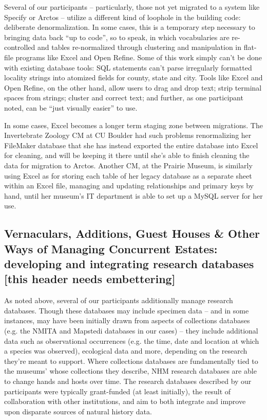 Several of our participants -- particularly, those not yet migrated to a system like Specify or Arctos -- utilize a different kind of loophole in the building code: deliberate denormalization. In some cases, this is a temporary step necessary to bringing data back “up to code”, so to speak, in which vocabularies are re-controlled and tables re-normalized through clustering and manipulation in flat-file programs like Excel and Open Refine. Some of this work simply can’t be done with existing database tools: SQL statements can’t parse irregularly formatted locality strings into atomized fields for county, state and city. Tools like Excel and Open Refine, on the other hand, allow users to drag and drop text; strip terminal spaces from strings; cluster and correct text; and further, as one participant noted, can be “just visually easier” to use.

In some cases, Excel becomes a longer term staging zone between migrations. The Invertebrate Zoology CM at CU Boulder had such problems renormalizing her FileMaker database that she has instead exported the entire database into Excel for cleaning, and will be keeping it there until she’s able to finish cleaning the data for migration to Arctos. Another CM, at the Prairie Museum, is similarly using Excel as for storing each table of her legacy database as a separate sheet within an Excel file, managing and updating relationships and primary keys by hand, until her museum’s IT department is able to set up a MySQL server for her use. 

\subsection{Vernaculars, Additions, Guest Houses \& Other Ways of Managing Concurrent Estates: developing and integrating research databases [this header needs embettering]} 

As noted above, several of our participants additionally manage research databases. Though these databases may include specimen data -- and in some instances, may have been initially drawn from aspects of collections databases (e.g. the NMITA and Mapstedi databases in our cases) -- they include additional data such as observational occurrences (e.g. the time, date and location at which a species was observed), ecological data and more, depending on the research they're meant to support. Where collections databases are fundamentally tied to the museums' whose collections they describe, NHM research databases are able to change hands and hosts over time. The research databases described by our participants were typically grant-funded (at least initially), the result of collaboration with other institutions, and aim to both integrate and improve upon disparate sources of natural history data. 

